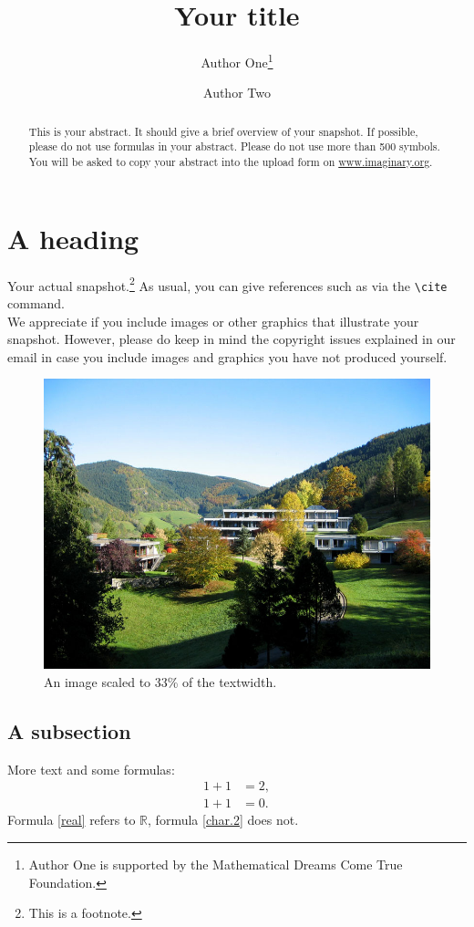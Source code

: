 \documentclass{snapshotmfo}
\author{Author One\thanks{Author One is supported by the Mathematical Dreams Come True Foundation.} \and Author Two}
\title{Your title}
\begin{document}
\begin{abstract}
This is your abstract. It should give a brief overview of your snapshot. If possible, please do not use formulas in your abstract. Please do not use more than 500 symbols. You will be asked to copy your abstract into the upload form on \href{http://www.imaginary.org}{www.imaginary.org}. 
\end{abstract}

\section{A heading}
Your actual snapshot.\footnote{This is a footnote.} As usual, you can give references such as \cite{snapshot, knuth1986texbook, wikiMath, sample13, sample12, sample11, sample14} via the \verb+\cite+ command.\\

We appreciate if you include images or other graphics that illustrate your snapshot. However, please do keep in mind the copyright issues explained in our email in case you include images and graphics you have not produced yourself.

\begin{figure}[h]
        \centering 
        \includegraphics[width= 0.33 \textwidth]{sample-image.jpg}
        \caption{An image scaled to 33\% of the textwidth.}
\label{fig:sample-image}
\end{figure}

\subsection{A subsection}
More text and some formulas:
\begin{align}\label{real}
1+1&=2,\\\label{char.2}
1+1&=0.
\end{align}
Formula \eqref{real} refers to $\mathbb{R}$, formula \eqref{char.2} does not.
\end{document}
